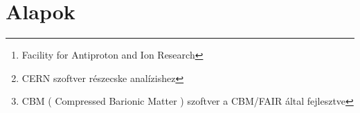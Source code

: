 \documentclass[a4paper,12pt]{article}
\begin{document}
\renewcommand{\abstractname}{Kivonat}
\renewcommand{\thesection}{\Roman{section}.}
\renewcommand{\thesubsection}{\thesection\arabic{subsection}}
\renewcommand{\thesubsubsection}{\thesubsection\arabic{subsubsection}}

\begin{abstract}
	\par Egy hónapot töltöttem a nyár folyamán, július hónapba, Darmstadtban a GSI nevű kutatóközpontban. Kint tartózkodásom célja az volt, hogy többet megtudjak a  CBM saját szimulációjáról, amely kutató csoport már az
	 épülő FAIR\footnote{ Facility for Antiproton and Ion Research } része. Ezalatt a hónap alatt megismerkedtem mélyebben a ROOT \footnote{ CERN szoftver részecske analízishez} nevű szoftverrel, a
	  helyi cbmROOT-tal \footnote{ CBM ( Compressed Barionic Matter  ) szoftver a CBM/FAIR által fejlesztve}, valamint a C és C++ programozási nyelvekkel.
	\vspace{5mm}
	\par A kint létem alatt sokat tanultam a detektor technológiákról, valamint az azokban lejátszódó eseményekről és örömmel voltam részese ennek a nagyszabású projektnek és a mindennapi kutatói életnek.
	\vspace{5mm}
	\par Itthoni munkám során a nehézion ütközések szimulációjához kapcsolódva egy klaszterező program fejlesztésével foglalkoztam, 
	ami a kinyert adatokat csoportosítja térbeli és impulzustérbeli távolságuk alapján, előre definiált klaszterezési mérettel, az MST algoritmus felhasználása segítségével.
\end{abstract}
\tableofcontents
\section{ Alapok}
\end{document}
